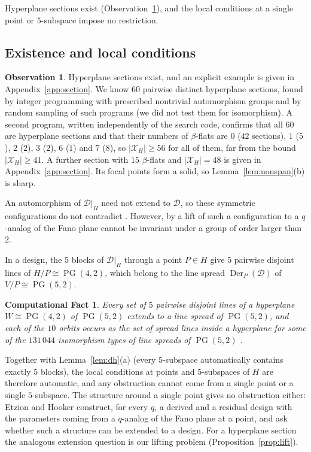 \documentclass[11pt]{amsart}
\newtheorem{fact}[theorem]{Computational Fact}
\theoremstyle{definition}
\newtheorem{observation}[theorem]{Observation}
\newcommand{\D}{\mathcal{D}}
\newcommand{\X}{\mathcal{X}}
\newcommand{\PG}{\operatorname{PG}}
\newcommand{\Der}{\operatorname{Der}}
\begin{document}
Hyperplane sections exist (Observation~\ref{obs:dh}), and the local conditions at a single point or $5$-subspace impose no restriction.

\subsection{Existence and local conditions}

\begin{observation}\label{obs:dh}
Hyperplane sections exist, and an explicit example is given in Appendix~\ref{app:section}. We know $60$ pairwise distinct hyperplane sections, found by integer programming with prescribed nontrivial automorphism groups and by random sampling of such programs (we did not test them for isomorphism). A second program, written independently of the search code, confirms that all $60$ are hyperplane sections and that their numbers of $\beta$-flats are $0$ ($42$ sections), $1$ ($5$), $2$ ($2$), $3$ ($2$), $6$ ($1$) and $7$ ($8$), so $|\X_H|\ge56$ for all of them, far from the bound $|\X_H|\ge41$. A further section with $15$ $\beta$-flats and $|\X_H|=48$ is given in Appendix~\ref{app:section}. Its focal points form a solid, so Lemma~\ref{lem:nonspan}(b) is sharp.
\end{observation}

An automorphism of $\D|_H$ need not extend to $\D$, so these symmetric configurations do not contradict \cite{KKW18}. However, by \cite{KKW18} a lift of such a configuration to a $q$-analog of the Fano plane cannot be invariant under a group of order larger than $2$.

In a design, the $5$ blocks of $\D|_H$ through a point $P\in H$ give $5$ pairwise disjoint lines of $H/P\cong\PG(4,2)$, which belong to the line spread $\Der_P(\D)$ of $V/P\cong\PG(5,2)$.

\begin{fact}\label{fact:local}
Every set of $5$ pairwise disjoint lines of a hyperplane $W\cong\PG(4,2)$ of $\PG(5,2)$ extends to a line spread of $\PG(5,2)$, and each of the $10$ orbits occurs as the set of spread lines inside a hyperplane for some of the $131\,044$ isomorphism types of line spreads of $\PG(5,2)$ \cite{MT09}.
\end{fact}

Together with Lemma~\ref{lem:dh}(a) (every $5$-subspace automatically contains exactly $5$ blocks), the local conditions at points and $5$-subspaces of $H$ are therefore automatic, and any obstruction cannot come from a single point or a single $5$-subspace. The structure around a single point gives no obstruction either: Etzion and Hooker \cite{EH18} construct, for every $q$, a derived and a residual design with the parameters coming from a $q$-analog of the Fano plane at a point, and ask whether such a structure can be extended to a design. For a hyperplane section the analogous extension question is our lifting problem (Proposition~\ref{prop:lift}).
\end{document}
